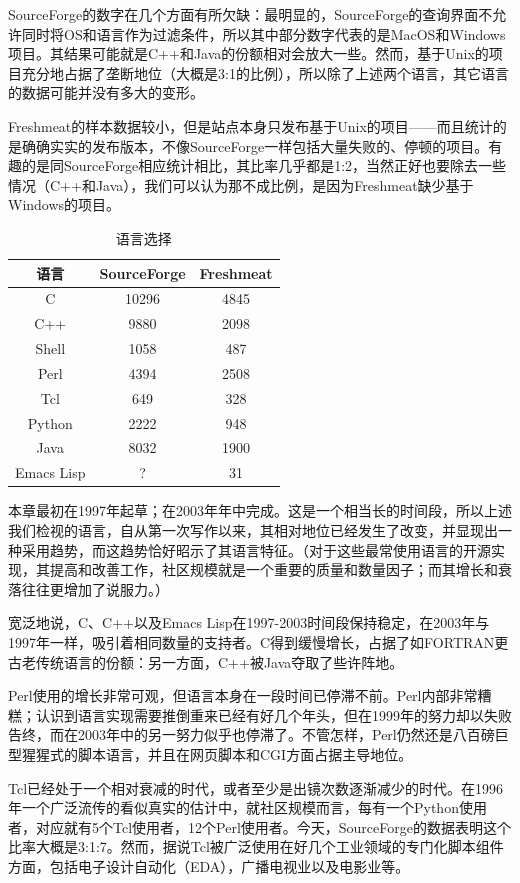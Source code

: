 \documentclass[12pt,oneside]{book}
\begin{document}
SourceForge的数字在几个方面有所欠缺：最明显的，SourceForge的查询界面不允许同时将OS和语言作为过滤条件，所以其中部分数字代表的是MacOS和Windows项目。其结果可能就是C++和Java的份额相对会放大一些。然而，基于Unix的项目充分地占据了垄断地位（大概是3:1的比例），所以除了上述两个语言，其它语言的数据可能并没有多大的变形。

Freshmeat的样本数据较小，但是站点本身只发布基于Unix的项目——而且统计的是确确实实的发布版本，不像SourceForge一样包括大量失败的、停顿的项目。有趣的是同SourceForge相应统计相比，其比率几乎都是1:2，当然正好也要除去一些情况（C++和Java），我们可以认为那不成比例，是因为Freshmeat缺少基于Windows的项目。

\begin{table}[H]
\centering
\caption{语言选择}
\label{tab:语言选择}
\medskip 
\begin{tabular}{@{}ccc@{}}
\toprule
语言 & SourceForge &  Freshmeat  \\ \midrule
C & 10296 & 4845 \\
C++ & 9880 & 2098 \\
Shell & 1058 & 487\\
Perl & 4394 & 2508\\
Tcl	 & 649 & 328\\
Python & 2222 & 948\\
Java & 8032 & 1900\\
Emacs Lisp & ? & 31
 \\ \bottomrule
\end{tabular}
\end{table}

本章最初在1997年起草；在2003年年中完成。这是一个相当长的时间段，所以上述我们检视的语言，自从第一次写作以来，其相对地位已经发生了改变，并显现出一种采用趋势，而这趋势恰好昭示了其语言特征。（对于这些最常使用语言的开源实现，其提高和改善工作，社区规模就是一个重要的质量和数量因子；而其增长和衰落往往更增加了说服力。）

宽泛地说，C、C++以及Emacs Lisp在1997-2003时间段保持稳定，在2003年与1997年一样，吸引着相同数量的支持者。C得到缓慢增长，占据了如FORTRAN更古老传统语言的份额：另一方面，C++被Java夺取了些许阵地。

Perl使用的增长非常可观，但语言本身在一段时间已停滞不前。Perl内部非常糟糕；认识到语言实现需要推倒重来已经有好几个年头，但在1999年的努力却以失败告终，而在2003年中的另一努力似乎也停滞了。不管怎样，Perl仍然还是八百磅巨型猩猩式的脚本语言，并且在网页脚本和CGI方面占据主导地位。

Tcl已经处于一个相对衰减的时代，或者至少是出镜次数逐渐减少的时代。在1996年一个广泛流传的看似真实的估计中，就社区规模而言，每有一个Python使用者，对应就有5个Tcl使用者，12个Perl使用者。今天，SourceForge的数据表明这个比率大概是3:1:7。然而，据说Tcl被广泛使用在好几个工业领域的专门化脚本组件方面，包括电子设计自动化（EDA），广播电视业以及电影业等。
\end{document}
